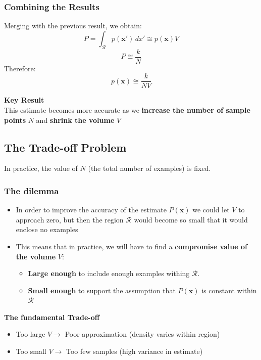 \documentclass[a4paper]{article}
\theoremstyle{definition}
\begin{document}
\subsubsection{Combining the Results}
Merging with the previous result, we obtain:
\[
  P = \int_{\mathcal{R}} p(\mathbf{x}')\,dx' \cong p(\mathbf{x}) V
\]
\[
  P \cong \frac{k}{N}
\]
Therefore:
\[
  p(\mathbf{x}) \cong \frac{k}{NV}
\]
\begin{tcolorbox}[
    colback=green!15!white,
    colframe=green!15!white,
    boxrule=0pt,
    arc=0pt,
    halign=center
]
    \textbf{Key Result}\\[0.6em]   
    This estimate becomes more accurate as we \textbf{increase the number of sample points} \( N \) and 
    \textbf{shrink the volume} \( V \)
\end{tcolorbox}
\subsection{The Trade-off Problem}
In practice, the value of \( N \) (the total number of examples) is fixed.
\subsubsection{The dilemma}
\begin{itemize}
    \item In order to improve the accuracy of the estimate \( P(\mathbf{x}) \) we could let \( V \) to approach zero, but then the region \( \mathcal{R} \) would become so small that it would enclose no examples 
    \item This means that in practice, we will have to find a \textbf{compromise value of the volume} \( V \):
    \begin{itemize}
        \item \textbf{Large enough} to include enough examples withing \( \mathcal{R} \).
        \item \textbf{Small enough} to support the assumption that \( P(\mathbf{x}) \) is constant within \( \mathcal{R} \) 
    \end{itemize}
\end{itemize}
\begin{tcolorbox}[
    colback=magenta!15!white,
    colframe=magenta!15!white,
    boxrule=0pt,
    arc=0pt,
    halign=center
]
    \textbf{The fundamental Trade-off}\\[0.6em]   
    \begin{itemize}
        \item Too large \( V \rightarrow \) Poor approximation (density varies within region)
        \item Too small \( V \rightarrow \) Too few samples (high variance in estimate)
    \end{itemize}
\end{tcolorbox}
\end{document}

